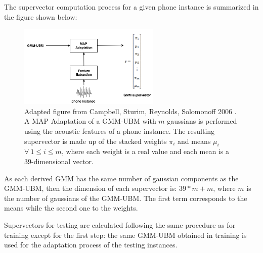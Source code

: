 The supervector computation process for a given phone instance
is summarized in the figure shown below:

\begin{figure}[H]
  \centering
  \includegraphics[width=0.6\textwidth]{files/figures/method/supervectors_extraction}
  \caption{
    Adapted figure from Campbell, Sturim, Reynolds, Solomonoff 2006 \cite{supervectors}.
    A MAP Adaptation of a GMM-UBM with $m$ gaussians
    is performed using the acoustic features of a phone instance.
    The resulting supervector is made up of the stacked weights $\pi_{i}$ and means
    $\mu_{i}$ $\forall \ 1 \leq i \leq m$, where each weight is a real value and each
    mean is a 39-dimensional vector.
  }
\end{figure}

As each derived GMM has the same number of gaussian components as the GMM-UBM, then the dimension
of each supervector is: $39*m + m$, where $m$ is the number of gaussians of the GMM-UBM. The
first term corresponds to the means while the second one to the weights.


Supervectors for testing are calculated following the same procedure as for training except for
the first step: the same GMM-UBM obtained in training is used for the adaptation process of the
testing instances.
